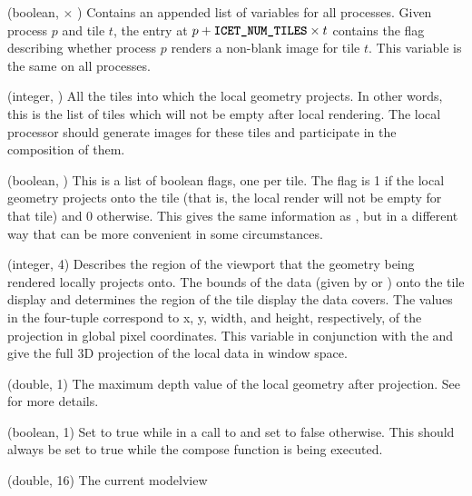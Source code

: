 \begin{Description}[xxxxxxxx]
\item[\CEnum{ICET\_ALL\_CONTAINED\_TILES\_MASKS}] (boolean,
   $\times$ ) Contains
  an appended list of  variables for
  all processes.  Given process $p$ and tile $t$, the entry at
  $p+\CEnum{ICET\_NUM\_TILES} \times t$ contains the flag describing
  whether process $p$ renders a non-blank image for tile $t$.  This
  variable is the same on all processes.
\item[\CEnum{ICET\_CONTAINED\_TILES\_LIST}] (integer,
  ) All the tiles into which the local
  geometry projects.  In other words, this is the list of tiles which will
  not be empty after local rendering.  The local processor should generate
  images for these tiles and participate in the composition of them.
\item[\CEnum{ICET\_CONTAINED\_TILES\_MASK}] (boolean,
  ) This is a list of boolean flags, one per tile.
  The flag is 1 if the local geometry projects onto the tile (that is, the
  local render will not be empty for that tile) and 0 otherwise.  This
  gives the same information as , but
  in a different way that can be more convenient in some circumstances.
\item[\CEnum{ICET\_CONTAINED\_VIEWPORT}] (integer, 4) Describes the region
  of the viewport that the geometry being rendered locally projects onto.
  The bounds of the data (given by  or
  ) onto the tile display and determines the
  region of the tile display the data covers.  The values in the four-tuple
  correspond to x, y, width, and height, respectively, of the projection in
  global pixel coordinates.  This variable in conjunction with the
   and  give the full 3D
  projection of the local data in window space.
\item[\CEnum{ICET\_FAR\_DEPTH}] (double, 1) The maximum depth value of the
  local geometry after projection.  See 
  for more details.
\item[\CEnum{ICET\_IS\_DRAWING\_FRAME}] (boolean, 1) Set to true while in a
  call to  and set to false otherwise.  This should
  always be set to true while the compose function is being executed.
\item[\CEnum{ICET\_MODELVIEW\_MATRIX}] (double, 16) The current modelview

\end{Description}
